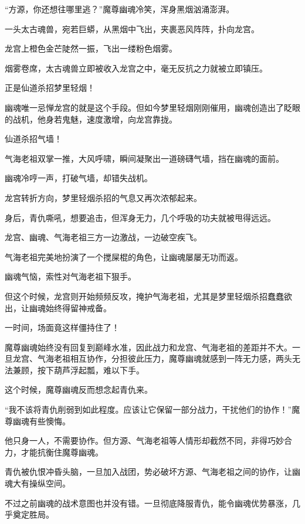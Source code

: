 
\begin{this_body}

“方源，你还想往哪里逃？”魔尊幽魂冷笑，浑身黑烟汹涌澎湃。

一头太古魂兽，宛若巨蟒，从黑烟中飞出，夹裹恶风阵阵，扑向龙宫。

龙宫上橙色金芒陡然一振，飞出一缕粉色烟雾。

烟雾卷席，太古魂兽立即被收入龙宫之中，毫无反抗之力就被立即镇压。

正是仙道杀招梦里轻烟！

幽魂唯一忌惮龙宫的就是这个手段。但如今梦里轻烟刚刚催用，幽魂创造出了眨眼的战机，他身若鬼魅，速度激增，向龙宫靠拢。

仙道杀招气墙！

气海老祖双掌一推，大风呼啸，瞬间凝聚出一道磅礴气墙，挡在幽魂的面前。

幽魂冷哼一声，打破气墙，却错失战机。

龙宫转折方向，梦里轻烟杀招的气息又再次浓郁起来。

身后，青仇嘶吼，想要追击，但浑身无力，几个呼吸的功夫就被甩得远远。

龙宫、幽魂、气海老祖三方一边激战，一边破空疾飞。

气海老祖完美地扮演了一个搅屎棍的角色，让幽魂屡屡无功而返。

幽魂气恼，索性对气海老祖下狠手。

但这个时候，龙宫则开始频频反攻，掩护气海老祖，尤其是梦里轻烟杀招蠢蠢欲出，让幽魂始终得留神戒备。

一时间，场面竟这样僵持住了！

魔尊幽魂始终没有回复到巅峰水准，因此战力和龙宫、气海老祖的差距并不大。一旦龙宫、气海老祖相互协作，分担彼此压力，魔尊幽魂就感到一阵无力感，两头无法兼顾，按下葫芦浮起瓢，难以下手。

这个时候，魔尊幽魂反而想念起青仇来。

“我不该将青仇削弱到如此程度。应该让它保留一部分战力，干扰他们的协作！”魔尊幽魂有些懊悔。

他只身一人，不需要协作。但方源、气海老祖等人情形却截然不同，非得巧妙合力，才能抗衡住魔尊幽魂。

青仇被仇恨冲昏头脑，一旦加入战团，势必破坏方源、气海老祖之间的协作，让幽魂大有操纵空间。

不过之前幽魂的战术意图也并没有错。一旦彻底降服青仇，能令幽魂优势暴涨，几乎奠定胜局。


\end{this_body}
